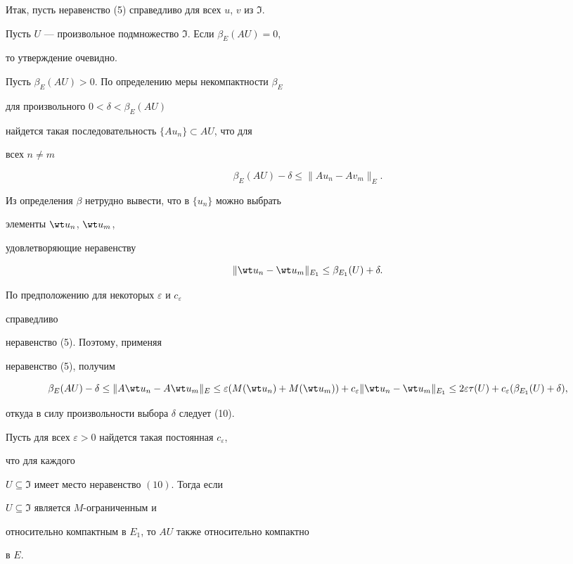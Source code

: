 


\begin{pf} 


Итак, пусть неравенство (5) справедливо для всех $u$, $v$ из $\Im$. 


Пусть $U$ --- произвольное подмножество $\Im$. Если $\beta_E(A{}U)=0$, 


то утверждение очевидно.  


Пусть $\beta_E(A{}U)>0$. По определению меры некомпактности $\beta_E$ 


для произвольного $0<\delta<\beta_E(A{}U)$ 


найдется такая последовательность $\{A{}u_n\}\subset A{}U$, что для 


всех $n\ne m$ 


$$ 


\beta_E(A U)-\delta\le\|A u_n-A v_m\|_E. 


$$ 


Из определения $\beta$ нетрудно вывести, что в $\{u_n\}$ можно выбрать 


элементы $\wt u_n$, $\wt u_m$, 


удовлетворяющие неравенству 


$$ 


\|\wt u_n-\wt u_m\|_{E_1}\le 


\beta_{E_1}(U)+\delta. 


$$ 


По предположению для некоторых $\varepsilon$ и $c_\varepsilon$ 


справедливо  


неравенство (5). Поэтому, применяя  


неравенство (5), получим 


$$ 


\beta_E(A U)-\delta\le\|A\wt u_n-A\wt u_m\|_E\le 


\varepsilon(M(\wt u_n)+M(\wt u_m))+c_\varepsilon 


\|\wt u_n-\wt u_m\|_{E_1}\le2\varepsilon\tau(U) 


+c_\varepsilon(\beta_{E_1}(U)+\delta), 


$$ 


откуда в силу произвольности выбора $\delta$ следует (10). 


\end{pf} 


 


\begin{prop} 


Пусть для всех $\varepsilon>0$ найдется такая постоянная $c_\varepsilon$, 


что для каждого  


$U\subseteq\Im$ имеет место неравенство $(10)$. Тогда если 


$U\subseteq\Im$ является $M$-ограниченным и  


относительно компактным в $E_1$, то $A{}U$ также относительно компактно 


в $E$.  


\end{prop} 


